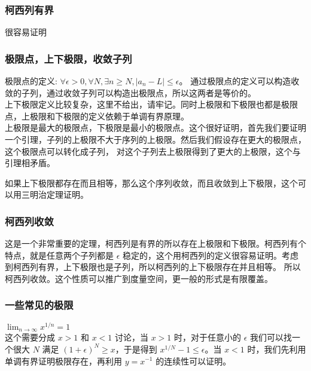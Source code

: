 \subsubsection{柯西列有界}

很容易证明

\subsubsection{极限点，上下极限，收敛子列}

极限点的定义: $\forall \epsilon > 0, \forall N, \exists n \ge N, \lvert a_n - L\rvert \le \epsilon $。
通过极限点的定义可以构造收敛的子列，通过收敛子列可以构造出极限点，所以这两者是等价的。 \\

上下极限定义比较复杂，这里不给出，请牢记。同时上极限和下极限也都是极限点，上极限和下极限的定义依赖于单调有界原理。 \\

上极限是最大的极限点，下极限是最小的极限点。这个很好证明，首先我们要证明一个引理，子列的上极限不大于序列的上极限。然后我们假设存在更大的极限点，这个极限点可以转化成子列，
对这个子列去上极限得到了更大的上极限，这个与引理相矛盾。

如果上下极限都存在而且相等，那么这个序列收敛，而且收敛到上下极限，这个可以用三明治定理证明。

\subsubsection{柯西列收敛}

这是一个非常重要的定理，柯西列是有界的所以存在上极限和下极限。柯西列有个特点，就是任意两个子列都是 $\epsilon$ 稳定的，这个用柯西列的定义很容易证明。考虑到柯西列有界，上下极限也是子列，所以柯西列的上下极限存在并且相等。
所以柯西列收敛。这个性质可以推广到度量空间，更一般的形式是有限覆盖。

\subsubsection{一些常见的极限}

$\lim_{n \to \infty}x^{1/n} = 1$ \\

这个需要分成 $x > 1$ 和 $x < 1 $ 讨论，当 $ x > 1$ 时，对于任意小的 $ \epsilon$ 我们可以找一个很大 $N$ 满足 $(1 + \epsilon) ^ N \ge x$，于是得到
$x^{1/N} - 1 \le  \epsilon$。当 $x < 1$ 时，我们先利用单调有界证明极限存在，再利用 $y=x^{-1}$ 的连续性可以证明。

